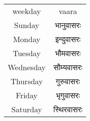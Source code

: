 \begin{table}
\begin{tabular}{cc}
weekday & vaara \\
Sunday & भानुवासरः \\
Monday & इन्दुवासरः \\
Tuesday & भौमवासरः \\
Wednesday & सौम्यवासरः \\
Thursday & गुरुवासरः \\
Friday & भृगुवासरः \\ 
Saturday & स्थिरवासरः \\  
\end{tabular}
\end{table}

